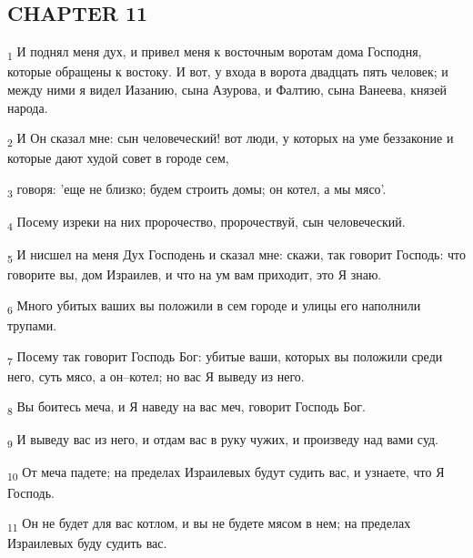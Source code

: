\subsection{CHAPTER 11}
\begin{tcolorbox}
\textsubscript{1} И поднял меня дух, и привел меня к восточным воротам дома Господня, которые обращены к востоку. И вот, у входа в ворота двадцать пять человек; и между ними я видел Иазанию, сына Азурова, и Фалтию, сына Ванеева, князей народа.
\end{tcolorbox}
\begin{tcolorbox}
\textsubscript{2} И Он сказал мне: сын человеческий! вот люди, у которых на уме беззаконие и которые дают худой совет в городе сем,
\end{tcolorbox}
\begin{tcolorbox}
\textsubscript{3} говоря: 'еще не близко; будем строить домы; он котел, а мы мясо'.
\end{tcolorbox}
\begin{tcolorbox}
\textsubscript{4} Посему изреки на них пророчество, пророчествуй, сын человеческий.
\end{tcolorbox}
\begin{tcolorbox}
\textsubscript{5} И нисшел на меня Дух Господень и сказал мне: скажи, так говорит Господь: что говорите вы, дом Израилев, и что на ум вам приходит, это Я знаю.
\end{tcolorbox}
\begin{tcolorbox}
\textsubscript{6} Много убитых ваших вы положили в сем городе и улицы его наполнили трупами.
\end{tcolorbox}
\begin{tcolorbox}
\textsubscript{7} Посему так говорит Господь Бог: убитые ваши, которых вы положили среди него, суть мясо, а он--котел; но вас Я выведу из него.
\end{tcolorbox}
\begin{tcolorbox}
\textsubscript{8} Вы боитесь меча, и Я наведу на вас меч, говорит Господь Бог.
\end{tcolorbox}
\begin{tcolorbox}
\textsubscript{9} И выведу вас из него, и отдам вас в руку чужих, и произведу над вами суд.
\end{tcolorbox}
\begin{tcolorbox}
\textsubscript{10} От меча падете; на пределах Израилевых будут судить вас, и узнаете, что Я Господь.
\end{tcolorbox}
\begin{tcolorbox}
\textsubscript{11} Он не будет для вас котлом, и вы не будете мясом в нем; на пределах Израилевых буду судить вас.
\end{tcolorbox}
